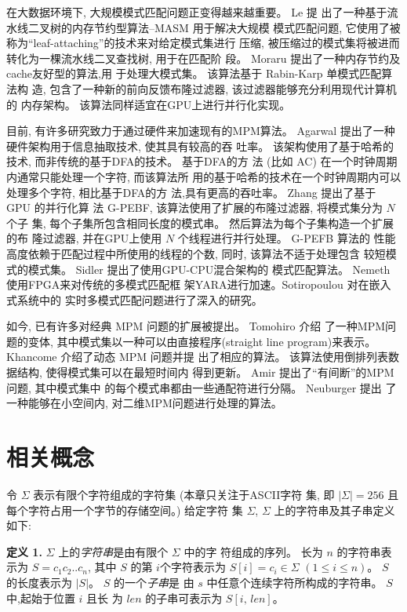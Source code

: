 在大数据环境下, 大规模模式匹配问题正变得越来越重要。 Le \cite{Le2013}提
出了一种基于流水线二叉树的内存节约型算法--\textsf{MASM} 用于解决大规模
模式匹配问题, 它使用了被称为“leaf-attaching”的技术来对给定模式集进行
压缩, 被压缩过的模式集将被进而转化为一棵流水线二叉查找树, 用于在匹配阶
段。 Moraru \cite{Moraru2012} 提出了一种内存节约及cache友好型的算法,用
于处理大模式集。 该算法基于 Rabin-Karp \cite{Karp1987} 单模式匹配算法构
造, 包含了一种新的前向反馈布隆过滤器, 该过滤器能够充分利用现代计算机的
内存架构。 该算法同样适宜在GPU上进行并行化实现。

目前, 有许多研究致力于通过硬件来加速现有的MPM算法。 Agarwal
\cite{Agarwal2013} 提出了一种硬件架构用于信息抽取技术, 使其具有较高的吞
吐率。 该架构使用了基于哈希的技术, 而非传统的基于DFA的技术。 基于DFA的方
法 (比如 \textsf{AC}) 在一个时钟周期内通常只能处理一个字符, 而该算法所
用的基于哈希的技术在一个时钟周期内可以处理多个字符, 相比基于DFA的方
法,具有更高的吞吐率。 Zhang \cite{Zhang2015} 提出了基于 GPU 的并行化算
法 \textsf{G-PEBF}, 该算法使用了扩展的布隆过滤器, 将模式集分为 $N$ 个子
集, 每个子集所包含相同长度的模式串。 然后算法为每个子集构造一个扩展的布
隆过滤器, 并在GPU上使用 $N$ 个线程进行并行处理。 \textsf{G-PEFB} 算法的
性能高度依赖于匹配过程中所使用的线程的个数, 同时, 该算法不适于处理包含
较短模式的模式集。 Sidler \cite{Sidler2017} 提出了使用GPU-CPU混合架构的
模式匹配算法。 Nemeth \cite{Nemeth2016} 使用FPGA来对传统的多模式匹配框
架YARA进行加速。Sotiropoulou \cite{Sotiropoulou2017} 对在嵌入式系统中的
实时多模式匹配问题进行了深入的研究。

如今, 已有许多对经典 MPM 问题的扩展被提出。 Tomohiro \cite{I2015} 介绍
了一种MPM问题的变体, 其中模式集以一种可以由直接程序(straight line
program)来表示。  Khancome \cite{Khancome2013} 介绍了动态 MPM 问题并提
出了相应的算法。 该算法使用倒排列表数据结构, 使得模式集可以在最短时间内
得到更新。 Amir \cite{Amir2015} 提出了“有间断”的MPM问题, 其中模式集中
的每个模式串都由一些通配符进行分隔。 Neuburger \cite{Neuburger2012}提出
了一种能够在小空间内, 对二维MPM问题进行处理的算法。

\section{相关概念}
\label{sec:2_notations}

令 $\Sigma$ 表示有限个字符组成的字符集 (本章只关注于ASCII字符
集, 即 $|\Sigma| = 256$ 且每个字符占用一个字节的存储空间。)  给定字符
集 $\Sigma$, $\Sigma$ 上的字符串及其子串定义如下:

\textbf{定义 1.}  $\Sigma$ 上的\emph{字符串}是由有限个 $\Sigma$ 中的字
符组成的序列。 长为 $n$ 的字符串表示为 $S =
c_1c_2..c_n$, 其中 $S$ 的第 $i$个字符表示为 $S[i] = c_i \in \Sigma$
$(1 \leq i \leq n)$。  $S$ 的长度表示为 $|S|$。 $S$ 的一个\emph{子串}是
由 $s$ 中任意个连续字符所构成的字符串。  $S$中,起始于位置 $i$ 且长
为 $len$ 的子串可表示为 $S[i,\,len]$。

